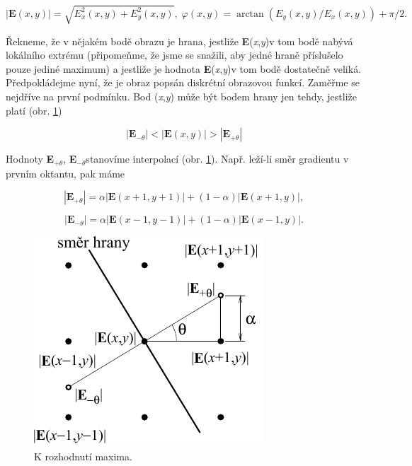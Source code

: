 \begin{equation} \label{eq:8_50}
    |\mathbf{E}(x, y)| = \sqrt{E_x^2(x, y) + E_y^2(x, y)}, \; \varphi(x, y) = \arctan(E_y(x, y) / E_x(x, y)) + \pi / 2.
\end{equation}

Řekneme, že v nějakém bodě obrazu je hrana, jestliže \textbar \textbf{E}(\textit{x},\textit{y})\textbar  v tom bodě nabývá lokálního extrému (připomeňme, že jsme se snažili, aby jedné hraně příslušelo pouze jediné maximum) a jestliže je hodnota \textbar \textbf{E}(\textit{x},\textit{y})\textbar  v tom bodě dostatečně veliká. Předpokládejme nyní, že je obraz popsán diskrétní obrazovou funkcí. Zaměřme se nejdříve na první podmínku. Bod (\textit{x},\textit{y}) může být bodem hrany jen tehdy, jestliže platí (obr. \ref{img:8_14})

\begin{equation} \label{eq:8_51}
    |\mathbf{E}_{-\theta}| < |\mathbf{E}(x, y)| > |\mathbf{E}_{+\theta}|
\end{equation}

Hodnoty \textbar \textbf{E}$_{+\theta}$\textbar, \textbar \textbf{E}$_{-\theta}$\textbar stanovíme interpolací (obr. \ref{img:8_14}). Např. leží-li směr gradientu v prvním oktantu, pak máme

\begin{equation} \label{eq:8_52}
    |\mathbf{E}_{+\theta}| = \alpha |\mathbf{E}(x+1, y+1)| + (1 - \alpha) |\mathbf{E}(x+1, y)|,
\end{equation}

\begin{equation} \label{eq:8_53}
    |\mathbf{E}_{-\theta}| = \alpha |\mathbf{E}(x-1, y-1)| + (1 - \alpha) |\mathbf{E}(x-1, y)|.
\end{equation}

\begin{figure}[th]
    \begin{center}
        \includegraphics[scale=0.9]{08_segmentace/images/img_8_14.pdf}
    \end{center}
    \caption{K rozhodnutí maxima.}
    \label{img:8_14}
\end{figure}

